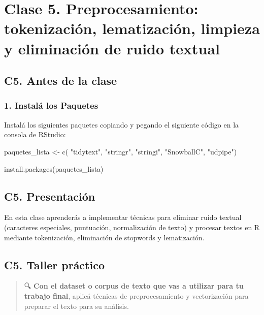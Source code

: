\documentclass[
  letterpaper,
  DIV=11,
  numbers=noendperiod]{scrreprt}
\newenvironment{Shaded}{\begin{snugshade}}{\end{snugshade}}
\newcommand{\FunctionTok}[1]{\textcolor[rgb]{0.28,0.35,0.67}{#1}}
\newcommand{\NormalTok}[1]{\textcolor[rgb]{0.00,0.23,0.31}{#1}}
\newcommand{\OtherTok}[1]{\textcolor[rgb]{0.00,0.23,0.31}{#1}}
\newcommand{\StringTok}[1]{\textcolor[rgb]{0.13,0.47,0.30}{#1}}
\begin{document}
\part{Clase 5. Preprocesamiento: tokenización, lematización, limpieza y
eliminación de ruido textual}

\chapter{C5. Antes de la clase}\label{c5.-antes-de-la-clase}

\section{\texorpdfstring{\textbf{1. Instalá los
Paquetes}}{1. Instalá los Paquetes}}\label{instaluxe1-los-paquetes-1}

Instalá los siguientes paquetes copiando y pegando el siguiente código
en la consola de RStudio:

\begin{Shaded}
\begin{Highlighting}[]

\NormalTok{paquetes\_lista }\OtherTok{\textless{}{-}} \FunctionTok{c}\NormalTok{(}
  \StringTok{"tidytext"}\NormalTok{, }\StringTok{"stringr"}\NormalTok{, }\StringTok{"stringi"}\NormalTok{, }\StringTok{"SnowballC"}\NormalTok{, }\StringTok{"udpipe"}\NormalTok{)}

\FunctionTok{install.packages}\NormalTok{(paquetes\_lista)}
\end{Highlighting}
\end{Shaded}

\chapter{C5. Presentación}\label{c5.-presentaciuxf3n}

En esta clase aprenderás a implementar técnicas para eliminar ruido
textual (caracteres especiales, puntuación, normalización de texto) y
procesar textos en R mediante tokenización, eliminación de stopwords y
lematización.

\chapter{C5. Taller práctico}\label{c5.-taller-pruxe1ctico}

\begin{quote}
🔍 \textbf{Con el dataset o corpus de texto que vas a utilizar para tu
trabajo final}, aplicá técnicas de preprocesamiento y vectorización para
preparar el texto para su análisis.
\end{quote}
\end{document}
